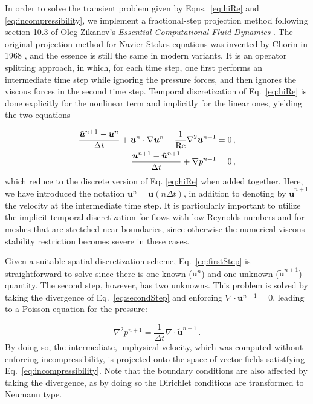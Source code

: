 \documentclass[final,3p,twocolumn]{elsarticle}
\begin{document}
In order to solve the transient problem given by Eqns.\ \eqref{eq:hiRe} and
\eqref{eq:incompressibility}, we implement a fractional-step projection method
following section 10.3 of Oleg Zikanov's {\em Essential Computational Fluid
Dynamics} \cite{zikanov2010essential}. The original projection method for
Navier-Stokes equations was invented by Chorin in 1968
\cite{chorin1968numerical}, and the essence is still the same in modern
variants. It is an operator splitting approach, in which, for each time step,
one first performs an intermediate time step while ignoring the pressure
forces, and then ignores the viscous forces in the second time step.
Temporal discretization of Eq. \eqref{eq:hiRe} is done explicitly for the
nonlinear term and implicitly for the linear ones, yielding the two equations 

\begin{align}
    \label{eq:firstStep}
    \frac{\tilde{\bm{u}}^{n+1} - \bm{u}^n}{\Delta t} + \bm{u}^n \cdot \nabla
    \bm{u}^n - \frac{1}{\rm Re} \nabla^2 \tilde{\bm{u}}^{n+1} &= 0 \,, \\
    \label{eq:secondStep}
    \frac{\bm{u}^{n+1} - \tilde{\bm{u}}^{n+1}}{\Delta t} + \nabla p^{n+1} &= 0
    \,,
\end{align}
%
which reduce to the discrete version of Eq. \eqref{eq:hiRe} when added
together. Here, we have introduced the notation $\bm{u}^n = \bm{u}(n \Delta
t)$, in addition to denoting by $\tilde{\bm{u}}^{n+1}$ the velocity at the
intermediate time step.  It is particularly important to utilize the implicit
temporal discretization for flows with low Reynolds numbers and for meshes that
are stretched near boundaries, since otherwise the numerical viscous stability
restriction becomes severe in these cases. 

Given a suitable spatial discretization scheme, Eq.\ \eqref{eq:firstStep} is
straightforward to solve since there is one known ($\bm{u}^n$) and one unknown
($\tilde{\bm{u}}^{n+1}$) quantity. The second step, however, has two unknowns.
This problem is solved by taking the divergence of Eq. \eqref{eq:secondStep}
and enforcing $\nabla \cdot \bm{u}^{n+1} = 0$, leading to a Poisson equation
for the pressure:

\begin{equation} 
    \nabla^2 p^{n+1} = \frac{1}{\Delta t} \nabla \cdot \tilde{\bm{u}}^{n+1} \,.
    \label{eq:poissonPressure}
\end{equation}
%
By doing so, the intermediate, unphysical velocity, which was computed without
enforcing incompressibility, is projected onto the space of vector fields
satistfying Eq.\ \eqref{eq:incompressibility}. Note that the boundary
conditions are also affected by taking the divergence, as by doing so the
Dirichlet conditions are transformed to Neumann type. 
\end{document}
